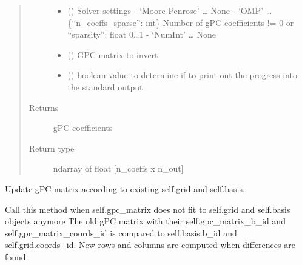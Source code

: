 \documentclass[letterpaper,10pt,english,openany,oneside]{sphinxmanual}
\begin{document}
\begin{fulllineitems}
\begin{fulllineitems}
\begin{quote}
\begin{description}
\begin{itemize}
\item {} 
 () \textendash{} Solver settings
- ‘Moore-Penrose’ … None
- ‘OMP’ … \{“n\_coeffs\_sparse”: int\} Number of gPC coefficients != 0 or “sparsity”: float 0…1
- ‘NumInt’ … None

\item {} 
 (\sphinxstyleliteralemphasis{\sphinxupquote{ {[}}}\sphinxstyleliteralemphasis{\sphinxupquote{{]}}}\sphinxstyleliteralemphasis{\sphinxupquote{, }}\sphinxstyleliteralemphasis{\sphinxupquote{, }}) \textendash{} GPC matrix to invert

\item {} 
 () \textendash{} boolean value to determine if to print out the progress into the standard output

\end{itemize}

\item[{Returns}] \leavevmode
{} \textendash{} gPC coefficients

\item[{Return type}] \leavevmode
ndarray of float {[}n\_coeffs x n\_out{]}

\end{description}\end{quote}

\end{fulllineitems}


\begin{fulllineitems}
\label{\detokenize{pygpc:pygpc.GPC.GPC.update_gpc_matrix}}
Update gPC matrix according to existing self.grid and self.basis.

Call this method when self.gpc\_matrix does not fit to self.grid and self.basis objects anymore
The old gPC matrix with their self.gpc\_matrix\_b\_id and self.gpc\_matrix\_coords\_id is compared
to self.basis.b\_id and self.grid.coords\_id. New rows and columns are computed when differences are found.

\end{fulllineitems}


\end{fulllineitems}
\end{document}
